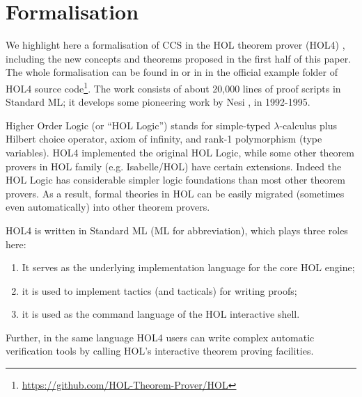 \section{Formalisation}
\label{s:for}
We highlight here a formalisation of CCS
in the HOL theorem
prover (HOL4) \cite{slind2008brief},
including the new concepts and theorems proposed in the first half of
this paper.
The whole formalisation can be found 
in \cite{Tian:2017wrba}  or in 
 in the official example folder of HOL4 source
code\footnote{\url{https://github.com/HOL-Theorem-Prover/HOL}}. The
work consists of about 20,000 lines of proof scripts in Standard ML;
it develops
some pioneering work by Nesi \cite{Nesi:1992ve}, in
1992-1995. 

Higher Order Logic (or ``HOL Logic'') \cite{hollogic} stands for simple-typed $\lambda$-calculus plus Hilbert
choice operator, axiom of infinity, and rank-1 polymorphism (type
variables). HOL4 implemented the original HOL Logic, 
while some other theorem provers in HOL family (e.g. Isabelle/HOL) have
certain extensions.
Indeed the HOL Logic has considerable simpler logic
foundations than most other theorem provers. %
As a result,
formal theories in HOL can be easily migrated (sometimes even
automatically) into other theorem provers.

HOL4 is written in Standard ML (ML for abbreviation), which plays three roles here:
\begin{enumerate}
\item It serves as the underlying implementation language for the core HOL engine;
\item it is used to implement tactics (and tacticals) for writing proofs;
\item it is used as the command language of the HOL interactive shell.
\end{enumerate}
Further, in the same language
 HOL4 users can write complex automatic
verification tools  by calling HOL's interactive theorem proving facilities.



